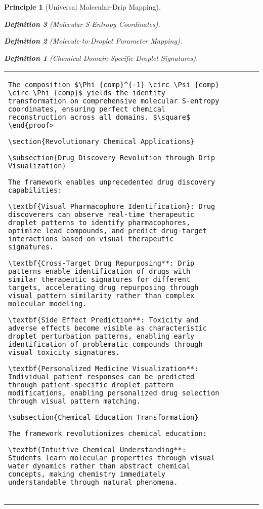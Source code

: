 \documentclass[12pt,a4paper]{article}
\newtheorem{definition}{Definition}
\newtheorem{principle}{Principle}
\begin{document}
\begin{principle}[Universal Molecular-Drip Mapping]
\begin{definition}[Molecular S-Entropy Coordinates]
\begin{definition}[Molecule-to-Droplet Parameter Mapping]
\begin{algorithm}
\begin{algorithmic}[1]
\begin{definition}[Chemical Domain-Specific Droplet Signatures]
\begin{table}[H]
\begin{tabular}{lcccc}
\begin{lstlisting}[style=pythonstyle, caption=Computer Vision Comprehensive Chemical Pattern Analysis]
The composition $\Phi_{comp}^{-1} \circ \Psi_{comp} \circ \Phi_{comp}$ yields the identity transformation on comprehensive molecular S-entropy coordinates, ensuring perfect chemical reconstruction across all domains. $\square$
\end{proof>

\section{Revolutionary Chemical Applications}

\subsection{Drug Discovery Revolution through Drip Visualization}

The framework enables unprecedented drug discovery capabilities:

\textbf{Visual Pharmacophore Identification}: Drug discoverers can observe real-time therapeutic droplet patterns to identify pharmacophores, optimize lead compounds, and predict drug-target interactions based on visual therapeutic signatures.

\textbf{Cross-Target Drug Repurposing**: Drip patterns enable identification of drugs with similar therapeutic signatures for different targets, accelerating drug repurposing through visual pattern similarity rather than complex molecular modeling.

\textbf{Side Effect Prediction**: Toxicity and adverse effects become visible as characteristic droplet perturbation patterns, enabling early identification of problematic compounds through visual toxicity signatures.

\textbf{Personalized Medicine Visualization**: Individual patient responses can be predicted through patient-specific droplet pattern modifications, enabling personalized drug selection through visual pattern matching.

\subsection{Chemical Education Transformation}

The framework revolutionizes chemical education:

\textbf{Intuitive Chemical Understanding**: Students learn molecular properties through visual water dynamics rather than abstract chemical concepts, making chemistry immediately understandable through natural phenomena.


\end{lstlisting}
\end{tabular}
\end{table}
\end{definition}
\end{algorithmic}
\end{algorithm}
\end{definition}
\end{definition}
\end{principle}
\end{document}
